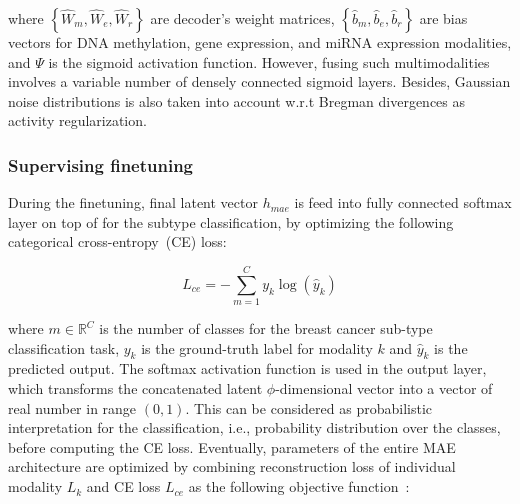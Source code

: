 \hspace*{3.5mm} where $\left\{\hat W_{m}, \hat W_{e}, \hat W_{r}\right\}$ are decoder's weight matrices, $\left\{\hat b_{m}, \hat b_{e}, \hat b_{r}\right\}$ are bias vectors for DNA methylation, gene expression, and miRNA expression modalities, and $\Psi$ is the sigmoid activation function. However, fusing such multimodalities involves a variable number of densely connected sigmoid layers. Besides, Gaussian noise distributions is also taken into account w.r.t Bregman divergences as activity regularization. 

\subsubsection{Supervising finetuning} 
During the finetuning, final latent vector $h_{mae}$ is feed into fully connected softmax layer on top of for the subtype classification, by optimizing the following categorical cross-entropy~(CE) loss: 

\begin{equation} 
    L_{ce}=-\sum_{m=1}^{C} y_{k} \log \left(\hat{y}_{k}\right)
\end{equation} 

\hspace*{3.5mm} where $m \in \mathbb{R}^{C}$ is the number of classes for the breast cancer sub-type classification task, $y_{k}$ is the ground-truth label for modality $k$ and $\hat{y}_{k}$ is the predicted output. The softmax activation function is used in the output layer, which transforms the concatenated latent $\phi$-dimensional vector into a vector of real number in range $\left(0,1\right)$. This can be considered as probabilistic interpretation for the classification, i.e., probability distribution over the classes, before computing the CE loss. Eventually, parameters of the entire MAE architecture are optimized by combining reconstruction loss of individual modality ${L}_{k}$ and CE loss ${L}_{ce}$ as the following objective function~\cite{mmdcae}: 

